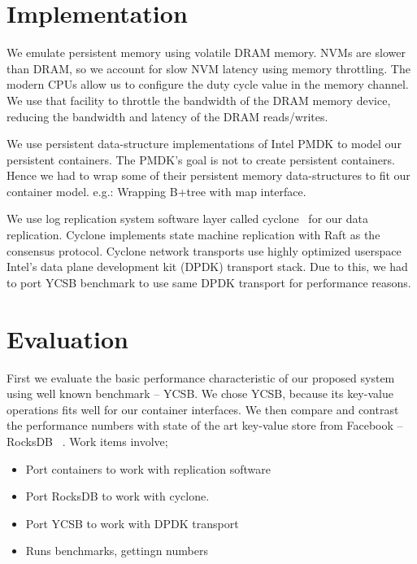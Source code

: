 \section{Implementation}
 We emulate persistent memory using volatile DRAM memory. NVMs are slower than DRAM, so we account for 
slow NVM latency using memory throttling. The modern CPUs allow us to configure the duty cycle value in the memory channel. We use that
facility to throttle the bandwidth of the DRAM memory device, reducing the bandwidth and latency of the DRAM reads/writes. 

We use persistent data-structure implementations of Intel PMDK to model our persistent containers. The PMDK's goal is not to 
create persistent containers. Hence we had to wrap some of their persistent memory data-structures to fit our container model.
e.g.: Wrapping B+tree with map interface.


We use log replication system software layer called cyclone~\cite{cyclone} for our data replication. Cyclone implements 
state machine replication with Raft as the consensus protocol. Cyclone network transports use highly optimized 
userspace Intel's data plane development kit (DPDK) transport stack. Due to this, we had to port YCSB benchmark to
use same DPDK transport for performance reasons.

\section{Evaluation}

First we evaluate the basic performance characteristic of our proposed system using well known benchmark -- YCSB. 
We chose YCSB, because its key-value operations fits well for our container interfaces. We then compare and contrast
the performance numbers with state of the art key-value store from Facebook -- RocksDB ~\cite{rocksdb}. Work items involve;
\begin{itemize}
\item Port containers to work with replication software
\item Port RocksDB to work with cyclone.
\item Port YCSB to work with DPDK transport
\item Runs benchmarks, gettingn numbers
\end{itemize}


